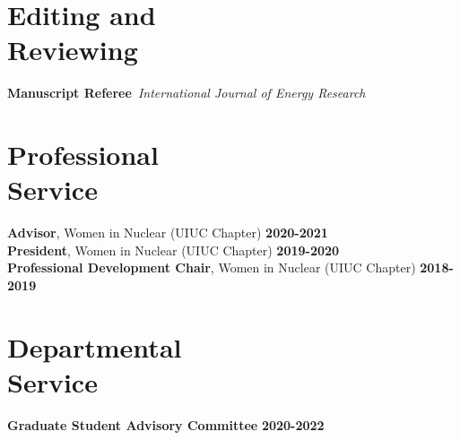 \documentclass[margin,line]{resume}
\begin{document}
\begin{resume}
    \section{\mysidestyle Editing and\\Reviewing}
    \textbf{Manuscript Referee}~\hfill\emph{International Journal of Energy Research}\\%
                            \vspace{-0.3cm}
    \section{\mysidestyle Professional\\Service}
                \textbf{Advisor}, Women in Nuclear (UIUC Chapter) \hfill \textbf{2020-2021}\vspace{.5mm}\\%
                \textbf{President}, Women in Nuclear (UIUC Chapter) \hfill \textbf{2019-2020}\vspace{.5mm}\\%
                \textbf{Professional Development Chair}, Women in Nuclear (UIUC Chapter) \hfill \textbf{2018-2019}\\%
                \vspace{-0.5cm}
    \section{\mysidestyle Departmental\\Service}
		\textbf{Graduate Student Advisory Committee} \hfill \textbf{2020-2022}\\%


\end{resume}
\end{document}
